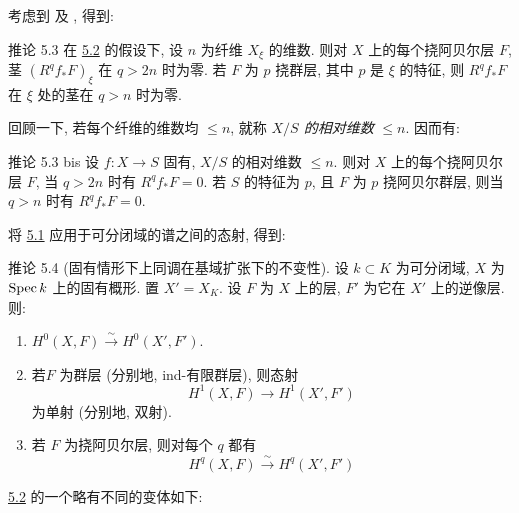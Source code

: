 考虑到  及 , 得到:

\begin{enonce*}{推论 5.3}
在 \hyperref[XII.cor5.2]{5.2} 的假设下, 设 $n$ 为纤维 $X_{\xi}$ 的维数. 则对 $X$ 上的每个挠阿贝尔层 $F$, 茎 $(R^qf_{\ast}F)_{\xi}$ 在 $q>2n$ 时为零. 若 $F$ 为 $p$ 挠群层, 其中 $p$ 是 $\xi$ 的特征, 则 $R^qf_{\ast}F$ 在 $\xi$ 处的茎在 $q>n$ 时为零.
\end{enonce*}

回顾一下, 若每个纤维的维数均 $\leq n$, 就称 \emph{$X/S$ 的相对维数} $\leq n$. 因而有:

\begin{enonce*}{推论 5.3 bis}
设 $f:X\longrightarrow S$ 固有, $X/S$ 的相对维数 $\leq n$. 则对 $X$ 上的每个挠阿贝尔层 $F$, 当 $q>2n$ 时有 $R^qf_{\ast}F=0$. 若 $S$ 的特征为 $p$, 且 $F$ 为 $p$ 挠阿贝尔群层, 则当 $q>n$ 时有 $R^qf_{\ast}F=0$.
\end{enonce*}

将 \hyperref[XII.thm5.1]{5.1} 应用于可分闭域的谱之间的态射, 得到:

\begin{enonce*}{推论 5.4}
(固有情形下上同调在基域扩张下的不变性). 设 $k\subset K$ 为可分闭域, $X$ 为 $\operatorname{Spec} k$ 上的固有概形. 置 $X'=X_K$. 设 $F$ 为 $X$ 上的层, $F'$ 为它在 $X'$ 上的逆像层. 则:
\begin{enumerate}
\renewcommand{\theenumi}{\roman{enumi}}
\renewcommand{\labelenumi}{(\theenumi)}
\item $H^0(X,F)\xrightarrow{\sim}H^0(X',F')$.

\item 若\pageoriginale $F$ 为群层 (分别地, ind-有限群层), 则态射
$$
H^1(X,F)\longrightarrow H^1(X',F')
$$
为单射 (分别地, 双射).

\item 若 $F$ 为挠阿贝尔层, 则对每个 $q$ 都有
$$
H^q(X,F)\xrightarrow{\sim}H^q(X',F')
$$
\end{enumerate}
\end{enonce*}

\hyperref[XII.cor5.2]{5.2} 的一个略有不同的变体如下:

